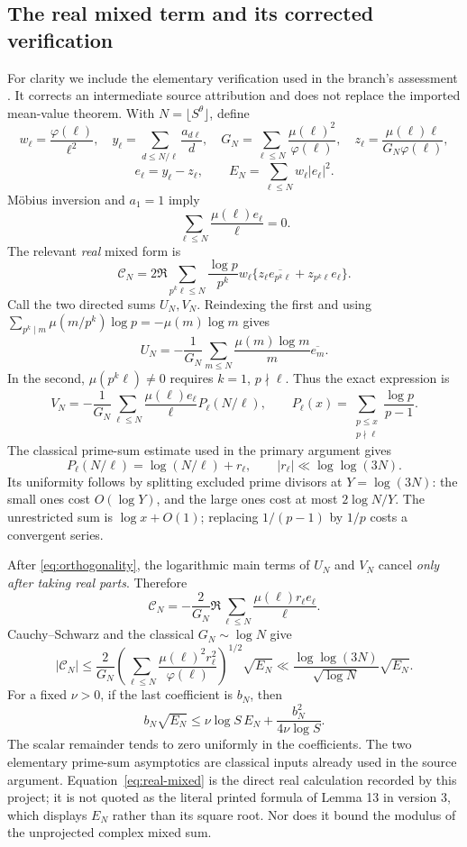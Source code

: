 \subsection{The real mixed term and its corrected verification}

For clarity we include the elementary verification used in the branch's
assessment \cite{OGCorrection,OGAssessment}. It corrects an intermediate
source attribution and does not replace the imported mean-value
theorem. With \(N=\lfloor S^\theta\rfloor\), define
\[
 w_\ell=\frac{\varphi(\ell)}{\ell^2},\quad
 y_\ell=\sum_{d\le N/\ell}\frac{a_{d\ell}}d,\quad
 G_N=\sum_{\ell\le N}\frac{\mu(\ell)^2}{\varphi(\ell)},\quad
 z_\ell=\frac{\mu(\ell)\ell}{G_N\varphi(\ell)},
\]
\[
 e_\ell=y_\ell-z_\ell,\qquad
 E_N=\sum_{\ell\le N}w_\ell|e_\ell|^2.
\]
Möbius inversion and \(a_1=1\) imply
\begin{equation}\label{eq:orthogonality}
 \sum_{\ell\le N}\frac{\mu(\ell)e_\ell}{\ell}=0.
\end{equation}
The relevant \emph{real} mixed form is
\[
 \mathcal C_N=
 2\Re\sum_{p^k\ell\le N}\frac{\log p}{p^k}w_\ell
       \{z_\ell\overline{e_{p^k\ell}}+z_{p^k\ell}e_\ell\}.
\]
Call the two directed sums \(U_N,V_N\).
Reindexing the first and using
\(\sum_{p^k\mid m}\mu(m/p^k)\log p=-\mu(m)\log m\) gives
\[
 U_N=-\frac1{G_N}\sum_{m\le N}
             \frac{\mu(m)\log m}{m}\overline{e_m}.
\]
In the second, \(\mu(p^k\ell)\ne0\) requires \(k=1\), \(p\nmid\ell\).
Thus the exact expression is
\[
 V_N=-\frac1{G_N}\sum_{\ell\le N}\frac{\mu(\ell)e_\ell}{\ell}
         P_\ell(N/\ell),\qquad
 P_\ell(x)=\sum_{\substack{p\le x\\p\nmid\ell}}\frac{\log p}{p-1}.
\]
The classical prime-sum estimate used in the primary argument gives
\[
 P_\ell(N/\ell)=\log(N/\ell)+r_\ell,\qquad
 |r_\ell|\ll\log\log(3N).
\]
Its uniformity follows by splitting excluded prime divisors at
\(Y=\log(3N)\): the small ones cost \(O(\log Y)\), and the large
ones cost at most \(2\log N/Y\).
The unrestricted sum is \(\log x+O(1)\); replacing
\(1/(p-1)\) by \(1/p\) costs a convergent series.

After \eqref{eq:orthogonality}, the logarithmic main terms of \(U_N\)
and \(V_N\) cancel \emph{only after taking real parts}. Therefore
\[
 \mathcal C_N=-\frac2{G_N}\Re
 \sum_{\ell\le N}\frac{\mu(\ell)r_\ell e_\ell}{\ell}.
\]
Cauchy--Schwarz and the classical \(G_N\sim\log N\) give
\begin{equation}\label{eq:real-mixed}
 |\mathcal C_N|
 \le\frac2{G_N}
 \left(\sum_{\ell\le N}\frac{\mu(\ell)^2r_\ell^2}{\varphi(\ell)}\right)^{1/2}
 \sqrt{E_N}
 \ll\frac{\log\log(3N)}{\sqrt{\log N}}\sqrt{E_N}.
\end{equation}
For a fixed \(\nu>0\), if the last coefficient is \(b_N\), then
\[
 b_N\sqrt{E_N}
 \le\nu\log S\,E_N+\frac{b_N^2}{4\nu\log S}.
\]
The scalar remainder tends to zero uniformly in the coefficients.
The two elementary prime-sum asymptotics are classical inputs already
used in the source argument. Equation~\eqref{eq:real-mixed} is the
direct real calculation recorded by this project; it is not quoted
as the literal printed formula of Lemma 13 in version 3, which displays
\(E_N\) rather than its square root. Nor does it bound the modulus
of the unprojected complex mixed sum.

